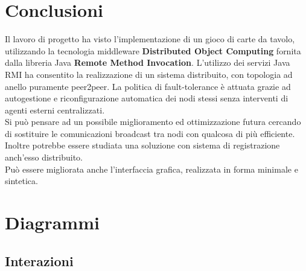 \documentclass[10pt,a4paper]{article}
\begin{document}
\section{Conclusioni}
Il lavoro di progetto ha visto l'implementazione di un gioco di carte da tavolo, utilizzando la tecnologia middleware \textbf{Distributed Object Computing} fornita dalla libreria Java \textbf{Remote Method Invocation}. L'utilizzo dei servizi Java RMI ha consentito la realizzazione di un sistema distribuito, con topologia ad anello puramente peer2peer. La politica di fault-tolerance è attuata grazie ad autogestione e riconfigurazione automatica dei nodi stessi senza interventi di agenti esterni centralizzati. \\Si può pensare ad un possibile miglioramento ed ottimizzazione futura cercando di sostituire le comunicazioni broadcast tra nodi con qualcosa di più efficiente. Inoltre potrebbe essere studiata una soluzione con sistema di registrazione anch'esso distribuito. \\ Può essere migliorata anche l'interfaccia grafica, realizzata in forma minimale e sintetica.  

\section{Diagrammi}

\subsection{Interazioni}
\end{document}
